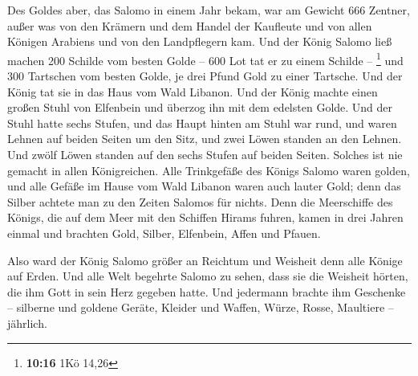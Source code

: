  Des Goldes aber, das Salomo in einem Jahr bekam, war am
Gewicht 666 Zentner,  außer was von den Krämern und dem
Handel der Kaufleute und von allen Königen Arabiens und von den
Landpflegern kam.  Und der König Salomo ließ machen 200
Schilde vom besten Golde -- 600 Lot tat er zu einem Schilde --
\footnote{\textbf{10:16} 1Kö 14,26}  und 300 Tartschen vom
besten Golde, je drei Pfund Gold zu einer Tartsche. Und der König tat
sie in das Haus vom Wald Libanon.  Und der König machte
einen großen Stuhl von Elfenbein und überzog ihn mit dem edelsten Golde.
 Und der Stuhl hatte sechs Stufen, und das Haupt hinten am
Stuhl war rund, und waren Lehnen auf beiden Seiten um den Sitz, und zwei
Löwen standen an den Lehnen.  Und zwölf Löwen standen auf
den sechs Stufen auf beiden Seiten. Solches ist nie gemacht in allen
Königreichen.  Alle Trinkgefäße des Königs Salomo waren
golden, und alle Gefäße im Hause vom Wald Libanon waren auch lauter
Gold; denn das Silber achtete man zu den Zeiten Salomos für nichts.
 Denn die Meerschiffe des Königs, die auf dem Meer mit den
Schiffen Hirams fuhren, kamen in drei Jahren einmal und brachten Gold,
Silber, Elfenbein, Affen und Pfauen.

 Also ward der König Salomo größer an Reichtum und Weisheit
denn alle Könige auf Erden.  Und alle Welt begehrte Salomo
zu sehen, dass sie die Weisheit hörten, die ihm Gott in sein Herz
gegeben hatte.  Und jedermann brachte ihm Geschenke --
silberne und goldene Geräte, Kleider und Waffen, Würze, Rosse, Maultiere
-- jährlich.

